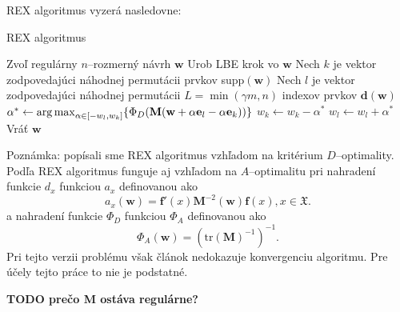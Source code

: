 REX algoritmus vyzerá nasledovne:

\begin{algorithm}[H]
	\caption{REX algoritmus \cite{rex_harman}}
	\label{rex}
	\begin{algorithmic}[1]
		\State Zvoľ regulárny $n$--rozmerný návrh $\mathbf w$
			\State Urob LBE krok vo $\mathbf w$
			\State Nech $k$ je vektor zodpovedajúci náhodnej permutácii prvkov supp$(\mathbf w)$
			\State Nech $l$ je vektor zodpovedajúci náhodnej permutácii $L=\min(\gamma m, n)$ indexov prvkov $\mathbf {d(w)}$
					\State $\alpha^* \leftarrow \operatorname*{arg\,max}_{\alpha \in [-w_l, w_k]} \{ \Phi_D(\mathbf M(\mathbf w+\alpha \mathbf e_l -\alpha \mathbf e_k))\}$
						\State $w_k \leftarrow w_k - \alpha^*$
						\State $w_l \leftarrow w_l + \alpha^*$
					\EndIf
				\EndFor
			\EndFor
		\EndWhile
		\State Vráť $\mathbf w$
	\end{algorithmic}
\end{algorithm}


Poznámka: popísali sme REX algoritmus vzhľadom na kritérium $D$--optimality. Podľa \cite{rex_harman} REX algoritmus funguje aj vzhľadom na $A$--optimalitu pri nahradení funkcie $d_x$ funkciou $a_x$ definovanou ako $$a_x(\mathbf w)=\mathbf {f'}(x)\mathbf M^{-2}(\mathbf w)\mathbf f(x), x \in \mathfrak X.$$ a nahradení funkcie $\Phi_D$ funkciou $\Phi_A$ definovanou ako $$\Phi_A(\mathbf{w})=(\text{tr}(\mathbf M)^{-1})^{-1}.$$ Pri tejto verzii problému však článok \cite{rex_harman} nedokazuje konvergenciu algoritmu. Pre účely tejto práce to nie je podstatné.

\textbf{TODO prečo M ostáva regulárne?}